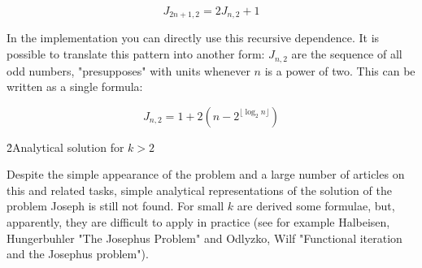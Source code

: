 $$ J_{2n+1,2} = 2 J_{n,2} + 1 $$

In the implementation you can directly use this recursive dependence. It is possible to translate this pattern into another form: $J_{n,2}$ are the sequence of all odd numbers, "presupposes" with units whenever $n$ is a power of two. This can be written as a single formula:

$$ J_{n,2} = 1 + 2 \left( n - 2^{\lfloor \log_2 n \rfloor} \right) $$

\h2{Analytical solution for $k>2$}

Despite the simple appearance of the problem and a large number of articles on this and related tasks, simple analytical representations of the solution of the problem Joseph is still not found. For small $k$ are derived some formulae, but, apparently, they are difficult to apply in practice (see for example Halbeisen, Hungerbuhler "The Josephus Problem" and Odlyzko, Wilf "Functional iteration and the Josephus problem").